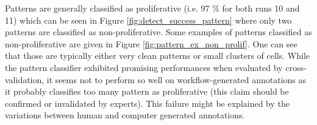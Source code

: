 Patterns are generally classified as proliferative (i.e. 97 \% for both runs 10 and 11) which can be seen in Figure \ref{fig:detect_success_pattern} where only two patterns are classified as non-proliferative. Some examples of patterns classified as non-proliferative are given in Figure \ref{fig:pattern_ex_non_prolif}. One can see that those are typically either very clean patterns or small clusters of cells. While the pattern classifier exhibited promising performances when evaluated by cross-validation, it seems not to perform so well on workflow-generated annotations as it probably classifies too many pattern as proliferative (this claim should be confirmed or invalidated by experts). This failure might be explained by the variations between human and computer generated annotations. 

\begin{figure}
	\center
\end{figure}
